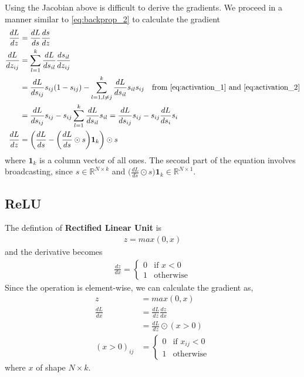 \documentclass[../../deep_learning_notes.tex]{subfiles}
\begin{document}
Using the Jacobian above is difficult to derive the gradients. We proceed in a manner similar to \eqref{eq:backprop_2} to calculate the gradient
\begin{align*}
    \frac{dL}{dz} &= \frac{dL}{ds} \frac{ds}{dz}\\
    \frac{dL}{dz_{ij}} &= \sum_{l=1}^{k} \frac{dL}{ds_{il}} \frac{ds_{il}}{dz_{ij}}\\
    &= \frac{dL}{ds_{ij}}s_{ij}(1-s_{ij}) - \sum_{l=1, l\neq j}^{k} \frac{dL}{ds_{il}}s_{il}s_{ij} \quad \text{from \eqref{eq:activation_1} and \eqref{eq:activation_2}}\\
    &= \frac{dL}{ds_{ij}}s_{ij} - s_{ij}\sum_{l=1}^{k}\frac{dL}{ds_{il}}s_{il}
    = \frac{dL}{ds_{ij}}s_{ij} - s_{ij}\frac{dL}{ds_{i}}s_{i}\\
    \frac{dL}{dz} &= \bigg( \frac{dL}{ds} - \bigg(\frac{dL}{ds} \odot s \bigg)\bm{1}_{k} \bigg) \odot s
\end{align*}
where $\bm{1}_{k}$ is a column vector of all ones. The second part of the equation involves broadcasting, since $s \in \mathbb{R}^{N \times k}$ and $\bigg(\frac{dL}{ds} \odot s \bigg)\bm{1}_{k} \in \mathbb{R}^{N \times 1}$.

\subsection{ReLU}
The defintion of \textbf{Rectified Linear Unit} is 
\begin{align*}
    z = max(0, x)
\end{align*}
and the derivative becomes
\begin{align*}
    \frac{dz}{dx} = \begin{cases}
        0 &\mbox{if $x < 0$}\\
        1 &\mbox{otherwise}
    \end{cases}
\end{align*}
Since the operation is element-wise, we can calculate the gradient as,
\begin{align*}
    z &= max(0, x)\\
    \frac{dL}{dx} &= \frac{dL}{dz} \frac{dz}{dx}\\
    &= \frac{dL}{dz} \odot (x > 0)\\
    (x > 0)_{ij} &= \begin{cases}
        0 &\mbox{if $x_{ij} < 0$}\\
        1 &\mbox{otherwise}
    \end{cases}
\end{align*}
where $x$ of shape $N \times k$.
\end{document}

